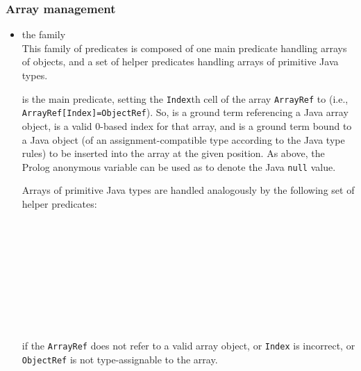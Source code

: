 \subsubsection{Array management}
\begin{itemize}

\item the  family\\
    This family of predicates is composed of one main predicate handling arrays of objects, and a set of helper predicates handling arrays of primitive Java types.

     is the main predicate, setting the \texttt{Index}th cell of the array \texttt{ArrayRef} to  (i.e., \texttt{ArrayRef[Index]=ObjectRef}).
    So,  is a ground term referencing a Java array object,  is a valid 0-based index for that array, and  is a ground term bound to a Java object (of an assignment-compatible type according to the Java type rules) to be inserted into the array at the given position.
    As above, the Prolog anonymous variable can be used as  to denote the Java \texttt{null} value.

    Arrays of primitive Java types are handled analogously by the following set of helper predicates:

    \mbox{~~~~}\\
    \mbox{~~~~}\\
    \mbox{~~~~}\\
    \mbox{~~~~}\\
    \mbox{~~~~}\\
    \mbox{~~~~}\\
    \mbox{~~~~}\\
    \mbox{~~~~}


     if the \texttt{ArrayRef} does not refer to a valid array object, or \texttt{Index} is incorrect, or \texttt{ObjectRef} is not type-assignable to the array.


\end{itemize}
